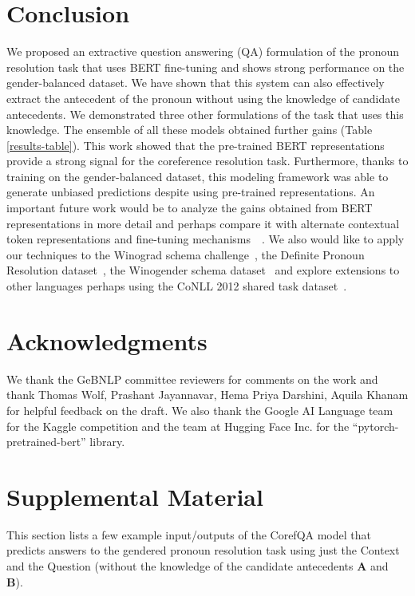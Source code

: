 \documentclass[11pt,a4paper]{article}
\begin{document}
\section{Conclusion}
We proposed an extractive question answering (QA) formulation of the pronoun resolution task that uses BERT fine-tuning and shows strong performance on the gender-balanced dataset. We have shown that this system can also effectively extract the antecedent of the pronoun without using the knowledge of candidate antecedents. We demonstrated three other formulations of the task that uses this knowledge. The ensemble of all these models obtained further gains (Table \ref{results-table}). This work showed that the pre-trained BERT representations provide a strong signal for the coreference resolution task. Furthermore, thanks to training on the gender-balanced dataset, this modeling framework was able to generate unbiased predictions despite using pre-trained representations. An important future work would be to analyze the gains obtained from BERT representations in more detail and perhaps compare it with alternate contextual token representations and fine-tuning mechanisms~\cite{peters-etal-2018-deep}~\cite{howard-ruder-2018-universal}. We also would like to apply our techniques to the Winograd schema challenge~\cite{levesque2012winograd}, the Definite Pronoun Resolution dataset~\cite{rahman2012resolving}, the Winogender schema dataset~\cite{rudinger-EtAl:2018:N18} and explore extensions to other languages perhaps using the CoNLL 2012 shared task dataset~\cite{pradhan2012conll}.

\section*{Acknowledgments}

We thank the GeBNLP committee reviewers for comments on the work and thank Thomas Wolf, Prashant Jayannavar, Hema Priya Darshini, Aquila Khanam for helpful feedback on the draft. We also thank the Google AI Language team for the Kaggle competition and the team at Hugging Face Inc. for the ``pytorch-pretrained-bert'' library.




\appendix
\section{Supplemental Material}
\label{sec:supplemental}
This section lists a few example input/outputs of the CorefQA model that predicts answers to the gendered pronoun resolution task using just the Context and the Question (without the knowledge of the candidate antecedents \textbf{A} and \textbf{B}).
\end{document}
